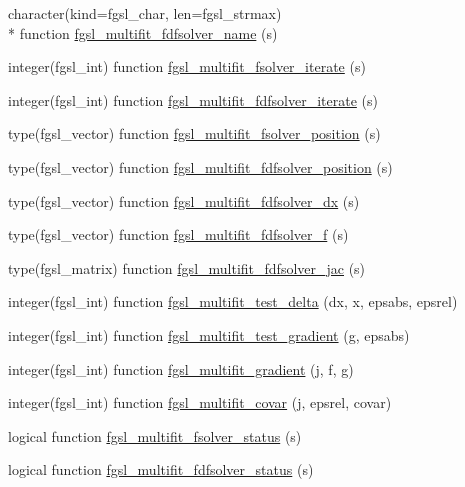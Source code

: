 \begin{DoxyCompactItemize}
\item 
character(kind=fgsl\-\_\-char, len=fgsl\-\_\-strmax) \\*
function \hyperlink{multifit_8finc_a771b7c045ca45cddece1bab084d81687}{fgsl\-\_\-multifit\-\_\-fdfsolver\-\_\-name} (s)
\item 
integer(fgsl\-\_\-int) function \hyperlink{multifit_8finc_a6262c763ec214a5143c1aec91f5f61a0}{fgsl\-\_\-multifit\-\_\-fsolver\-\_\-iterate} (s)
\item 
integer(fgsl\-\_\-int) function \hyperlink{multifit_8finc_a62a0cfaf39d63305b4e9ec2feae62e58}{fgsl\-\_\-multifit\-\_\-fdfsolver\-\_\-iterate} (s)
\item 
type(fgsl\-\_\-vector) function \hyperlink{multifit_8finc_ae18bf66b9d8137530d9e00d789cd1b47}{fgsl\-\_\-multifit\-\_\-fsolver\-\_\-position} (s)
\item 
type(fgsl\-\_\-vector) function \hyperlink{multifit_8finc_a21df223213883480f389a670b22333a2}{fgsl\-\_\-multifit\-\_\-fdfsolver\-\_\-position} (s)
\item 
type(fgsl\-\_\-vector) function \hyperlink{multifit_8finc_a5d5d7621f0e81fd1eaf2c01119a9e9ee}{fgsl\-\_\-multifit\-\_\-fdfsolver\-\_\-dx} (s)
\item 
type(fgsl\-\_\-vector) function \hyperlink{multifit_8finc_af31bdf3274659259d4a5bc4eb3e93275}{fgsl\-\_\-multifit\-\_\-fdfsolver\-\_\-f} (s)
\item 
type(fgsl\-\_\-matrix) function \hyperlink{multifit_8finc_ab24fe31ab5a3648bb2aeb958e0a5e2e9}{fgsl\-\_\-multifit\-\_\-fdfsolver\-\_\-jac} (s)
\item 
integer(fgsl\-\_\-int) function \hyperlink{multifit_8finc_a32b6331d1e1c82610b617328dc3234cf}{fgsl\-\_\-multifit\-\_\-test\-\_\-delta} (dx, x, epsabs, epsrel)
\item 
integer(fgsl\-\_\-int) function \hyperlink{multifit_8finc_a6f3f38114ba37459b8d28d7757b0ae3c}{fgsl\-\_\-multifit\-\_\-test\-\_\-gradient} (g, epsabs)
\item 
integer(fgsl\-\_\-int) function \hyperlink{multifit_8finc_a0451b9c85929c00cd7c5a6ad103dfea3}{fgsl\-\_\-multifit\-\_\-gradient} (j, f, g)
\item 
integer(fgsl\-\_\-int) function \hyperlink{multifit_8finc_a843fbc4d78a3e84e537c8b2c10eff8ef}{fgsl\-\_\-multifit\-\_\-covar} (j, epsrel, covar)
\item 
logical function \hyperlink{multifit_8finc_a3945d89bd5d38c87bb6808ee41382e31}{fgsl\-\_\-multifit\-\_\-fsolver\-\_\-status} (s)
\item 
logical function \hyperlink{multifit_8finc_ae28da5d71114b0974e5da3acd305fe34}{fgsl\-\_\-multifit\-\_\-fdfsolver\-\_\-status} (s)
\end{DoxyCompactItemize}


